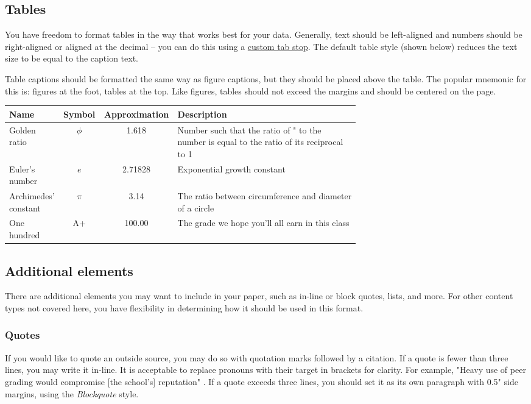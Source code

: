 \documentclass[
	letterpaper, %
]{jdf}
\begin{document}
\subsection{Tables}
You have freedom to format tables in the way that works best for your data. Generally, text should be left-aligned and numbers should be right-aligned or aligned at the decimal – you can do this using a \href{https://practicaltypography.com/tabs-and-tab-stops.html}{custom tab stop}. The default table style (shown below) reduces the text size to be equal to the caption text.

Table captions should be formatted the same way as figure captions, but they should be placed above the table. The popular mnemonic for this is: figures at the foot, tables at the top. Like figures, tables should not exceed the margins and should be centered on the page.

\begin{jdftable}
\label{table:Example}
\small %
\begin{tabular}{@{} L{0.15\linewidth} c S L{0.52\linewidth}}
	\textbf{Name} & \textbf{Symbol} & \textbf{Approximation} & \textbf{Description} \\
	\toprule[0.5pt]
	Golden ratio & $\phi$ & 1.618 & Number such that the ratio of " to the number is equal to the ratio of its reciprocal to 1\\
	\midrule
	Euler's number & $e$ & 2.71828 & Exponential growth constant\\
	\midrule
	Archimedes' constant & $\pi$ & 3.14 & The ratio between circumference and diameter of a circle\\
	\midrule
	One hundred & A+ & 100.00 & The grade we hope you’ll all earn in this class\\
\end{tabular}
\end{jdftable}

\subsection{Additional elements}
There are additional elements you may want to include in your paper, such as in-line or block quotes, lists, and more. For other content types not covered here, you have flexibility in determining how it should be used in this format.

\subsubsection{Quotes}
If you would like to quote an outside source, you may do so with quotation marks followed by a citation. If a quote is fewer than three lines, you may write it in-line. It is acceptable to replace pronouns with their target in brackets for clarity. For example, "Heavy use of peer grading would compromise [the school’s] reputation" \citep{joyner2016}. If a quote exceeds three lines, you should set it as its own paragraph with 0.5" side margins, using the \emph{Blockquote} style.
\end{document}
